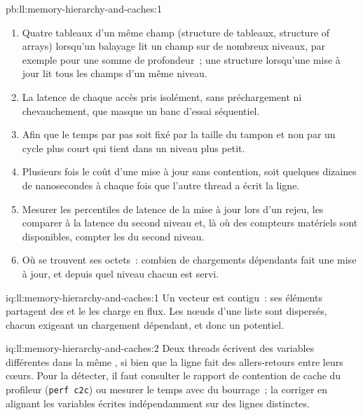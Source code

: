 \begin{solution}{pb:ll:memory-hierarchy-and-caches:1}
\begin{enumerate}
frontière de ligne et coûtent deux .
\item Quatre tableaux d'un même champ (structure de tableaux, structure of arrays) lorsqu'un balayage lit un champ sur de nombreux niveaux, par exemple pour une somme de profondeur~; une
structure lorsqu'une mise à jour lit tous les champs d'un même niveau.
\item La latence de chaque accès pris isolément, sans préchargement ni chevauchement, que masque un banc d'essai séquentiel.
\item Afin que le temps par pas soit fixé par la taille du tampon et non par un cycle plus court qui tient dans un niveau plus petit.
\item Plusieurs fois le coût d'une mise à jour sans contention, soit quelques dizaines de nanosecondes à chaque fois que l'autre thread a écrit la ligne.
\item Mesurer les percentiles de latence de la mise à jour lors d'un rejeu, les comparer à la latence du second niveau et, là où des compteurs matériels
sont disponibles, compter les  du second niveau.
\item Où se trouvent ses octets~: combien de chargements dépendants fait une mise à jour, et depuis quel niveau chacun est servi.
\end{enumerate}
\end{solution}

\begin{solution}{iq:ll:memory-hierarchy-and-caches:1}
Un vecteur est contigu~: ses éléments partagent des  et le  les charge en flux. Les nœuds d'une liste sont dispersés, chacun exigeant
un chargement dépendant, et donc un  potentiel.
\end{solution}

\begin{solution}{iq:ll:memory-hierarchy-and-caches:2}
Deux threads écrivent des variables différentes dans la même , si bien que la ligne fait des allers-retours entre leurs cœurs. Pour la détecter, il faut
consulter le rapport de contention de cache du profileur (\texttt{perf c2c}) ou mesurer le temps avec du bourrage~; la corriger en alignant
les variables écrites indépendamment sur des lignes distinctes.
\end{solution}


